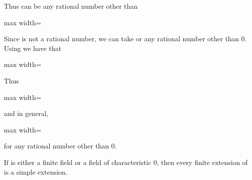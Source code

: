 \documentclass[11pt,oneside]{article}
\begin{document}
\BookNarrativetrue

\begin{BookBody}

\noindent Thus  can be any rational number other than

\begin{center}\begin{adjustbox}{max width=\linewidth}\end{adjustbox}\end{center}

\noindent Since  is not a rational number, we can take  or any rational number other than 0. Using  we have that

\begin{center}\begin{adjustbox}{max width=\linewidth}\end{adjustbox}\end{center}

\noindent Thus

\begin{center}\begin{adjustbox}{max width=\linewidth}\end{adjustbox}\end{center}

\noindent and in general,

\begin{center}\begin{adjustbox}{max width=\linewidth}\end{adjustbox}\end{center}

\noindent for any rational number  other than 0. \BookEnd{\blacktriangle}

 If  is either a finite field or a field of characteristic 0, then every finite extension of  is a simple extension.


\end{BookBody}
\end{document}
